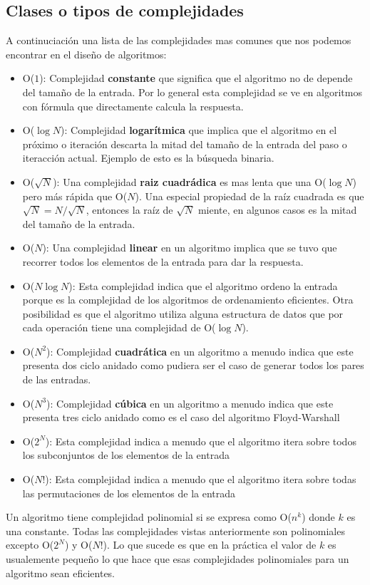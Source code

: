 \subsection{Clases o tipos de complejidades}

A continuciación una lista de las complejidades mas comunes que nos podemos encontrar en el diseño de algoritmos:

\begin{itemize}
	\item O($1$): Complejidad \textbf{constante} que significa que el algoritmo no de depende del tamaño de la entrada. Por lo general esta complejidad se ve en algoritmos con fórmula que directamente calcula la respuesta.
	\item O($\log N$): Complejidad \textbf{logarítmica} que implica que el algoritmo en el próximo o iteración descarta la mitad del tamaño de la entrada del paso o iteracción actual. Ejemplo de esto es la búsqueda binaria.
	\item O($\sqrt{N}$): Una complejidad \textbf{raiz cuadrádica} es mas lenta que una O($\log N$) pero más rápida que O($N$). Una especial propiedad de la raíz cuadrada es que $\sqrt{N}=N/\sqrt{N}$, entonces la raíz de $\sqrt{N}$ miente, en algunos casos es la mitad del tamaño de la entrada.
	\item O($N$): Una complejidad \textbf{linear} en un algoritmo implica que se tuvo que recorrer todos los elementos de la entrada para dar la respuesta.
	\item O($N \log N$): Esta complejidad indica que el algoritmo ordeno la entrada porque es la complejidad de los algoritmos de ordenamiento eficientes. Otra posibilidad es que el algoritmo utiliza alguna estructura de datos que por cada operación tiene una complejidad de O($\log N$).
	\item O($N^2$): Complejidad \textbf{cuadrática} en un algoritmo a menudo indica que este presenta dos ciclo anidado como pudiera ser el caso de generar todos los pares de las entradas. 
	\item O($N^3$): Complejidad \textbf{cúbica} en un algoritmo a menudo indica que este presenta tres ciclo anidado como es el caso del algoritmo Floyd-Warshall
	\item O($2^N$): Esta complejidad indica a menudo que el algoritmo itera sobre todos los subconjuntos de los elementos de la entrada
	\item O($N!$): Esta complejidad indica a menudo que el algoritmo itera sobre todas las permutaciones  de los elementos de la entrada
\end{itemize}

Un algoritmo tiene complejidad polinomial si se expresa como O($n^k$) donde $k$ es una constante. Todas las complejidades vistas anteriormente son polinomiales excepto O($2^N$) y O($N!$). Lo que sucede es que en la práctica el valor de $k$ es usualemente pequeño lo que hace que esas complejidades polinomiales para un algoritmo sean eficientes.


